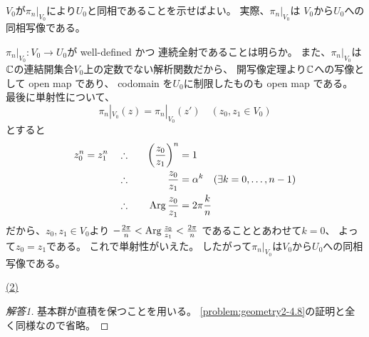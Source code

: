 \documentclass[report]{jlreq}
\begin{document}
\begin{answer}
    $V_0$が$\pi_n|_{V_0}$により$U_0$と同相であることを示せばよい。
    実際、$\pi_n|_{V_0}$は
    $V_0$から$U_0$への同相写像である。
    \begin{innerproof}
        $\pi_n|_{V_0} \colon V_0 \to U_0$が well-defined かつ
        連続全射であることは明らか。
        また、$\pi_n|_{V_0}$は$\mathbb{C}$の連結開集合$V_0$上の定数でない解析関数だから、
        開写像定理より$\mathbb{C}$への写像として open map であり、
        codomain を$U_0$に制限したものも open map である。
        最後に単射性について、
        \begin{equation}
            \pi_n|_{V_0}(z) = \pi_n|_{V_0}(z')
            \quad
            (z_0, z_1 \in V_0)
        \end{equation}
        とすると
        \begin{alignat}{2}
            z_0^n = z_1^n \quad
                &\therefore &\quad \left(\frac{z_0}{z_1}\right)^n &= 1 \\
                &\therefore &\quad \frac{z_0}{z_1} &= \alpha^k
                \quad (\exists k = 0, \dots, n - 1) \\
                &\therefore &\quad \operatorname{Arg} \frac{z_0}{z_1} &= 2\pi \frac{k}{n}
        \end{alignat}
        だから、$z_0, z_1 \in V_0$より
        $- \frac{2\pi}{n} < \operatorname{Arg} \frac{z_0}{z_1} < \frac{2\pi}{n}$
        であることとあわせて$k = 0$、
        よって$z_0 = z_1$である。
        これで単射性がいえた。
        したがって$\pi_n|_{V_0}$は$V_0$から$U_0$への同相写像である。
    \end{innerproof}

    \uline{(2)} \quad
    \TODO{}
\end{answer}


\begin{proof}[解答1]
    基本群が直積を保つことを用いる。
    \cref{problem:geometry2-4.8}の証明と全く同様なので省略。
\end{proof}
\end{document}
